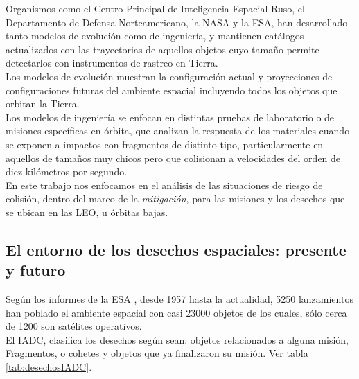 Organismos como el Centro Principal de Inteligencia Espacial Ruso, el Departamento de Defensa Norteamericano, la NASA y la \ac{ESA}, han desarrollado tanto modelos de evoluci\'on como de ingenier\'ia, y mantienen cat\'alogos actualizados con las trayectorias de aquellos objetos cuyo tama\~no permite detectarlos con instrumentos de rastreo en Tierra.\\

Los modelos de evoluci\'on muestran la configuraci\'on actual y proyecciones de configuraciones futuras del ambiente espacial incluyendo todos los objetos que orbitan la Tierra.\\

Los modelos de ingenier\'ia se enfocan en distintas pruebas de laboratorio o de misiones espec\'ificas en \'orbita, que analizan la respuesta de los materiales cuando se exponen a impactos con fragmentos de distinto tipo, particularmente en aquellos de tama\~nos muy chicos pero que colisionan a velocidades del orden de diez kil\'ometros por segundo.\\

En este trabajo nos enfocamos en el an\'alisis de las situaciones de riesgo de colisi\'on, dentro del marco de la {\it{mitigaci\'on}}, para las misiones y los desechos que se ubican en las  \ac{LEO}, u \'orbitas bajas.\\

\subsection*{El entorno de los desechos espaciales: presente y futuro}
Seg\'un los informes de la \ac{ESA} \citep{esaSD}, desde 1957 hasta la actualidad, 5250 lanzamientos han poblado el ambiente espacial con casi 23000 objetos de los cuales, s\'olo cerca de 1200 son sat\'elites operativos.\\

El \ac{IADC}, clasifica los desechos seg\'un sean: objetos relacionados a alguna misi\'on, Fragmentos, o cohetes y objetos que ya finalizaron su misi\'on. Ver tabla \ref{tab:desechosIADC}.\\

